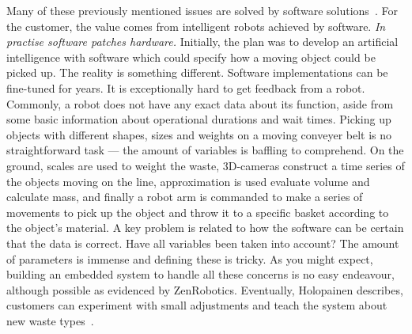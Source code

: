 \documentclass[english]{tktltiki2}
\begin{document}
Many of these previously mentioned issues are solved by software solutions~\cite{Hol15a}. For the customer, the value comes from intelligent robots achieved by software. \emph{In practise software patches hardware.} Initially, the plan was to develop an artificial intelligence with software which could specify how a moving object could be picked up. The reality is something different. Software implementations can be fine-tuned for years. It is exceptionally hard to get feedback from a robot. Commonly, a robot does not have any exact data about its function, aside from some basic information about operational durations and wait times. Picking up objects with different shapes, sizes and weights on a moving conveyer belt is no straightforward task — the amount of variables is baffling to comprehend. On the ground, scales are used to weight the waste, 3D-cameras construct a time series of the objects moving on the line, approximation is used evaluate volume and calculate mass, and finally a robot arm is commanded to make a series of movements to pick up the object and throw it to a specific basket according to the object’s material. A key problem is related to how the software can be certain that the data is correct. Have all variables been taken into account? The amount of parameters is immense and defining these is tricky. As you might expect, building an embedded system to handle all these concerns is no easy endeavour, although possible as evidenced by ZenRobotics. Eventually, Holopainen describes, customers can experiment with small adjustments and teach the system about new waste types~\cite{Hol15a}.
\end{document}
